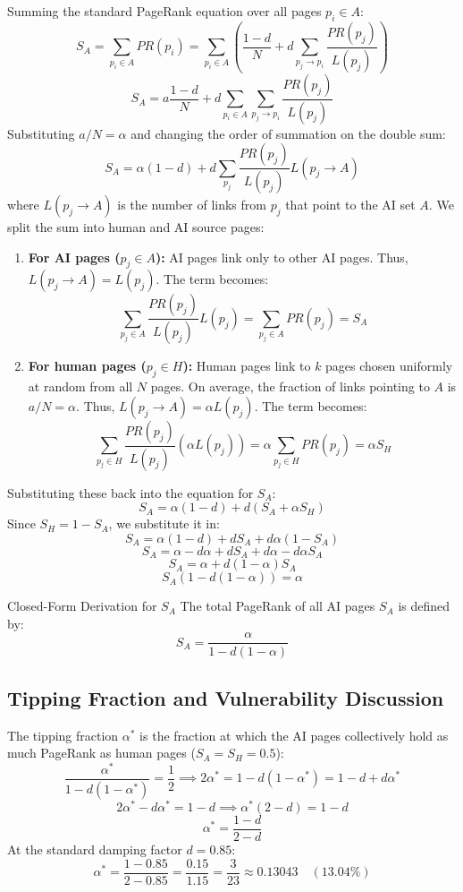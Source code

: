 \documentclass[11pt,a4paper]{article}
\begin{document}
Summing the standard PageRank equation over all pages $p_i \in A$:
\[ S_A = \sum_{p_i \in A} PR(p_i) = \sum_{p_i \in A} \left( \frac{1-d}{N} + d \sum_{p_j \to p_i} \frac{PR(p_j)}{L(p_j)} \right) \]
\[ S_A = a \frac{1-d}{N} + d \sum_{p_i \in A} \sum_{p_j \to p_i} \frac{PR(p_j)}{L(p_j)} \]
Substituting $a/N = \alpha$ and changing the order of summation on the double sum:
\[ S_A = \alpha(1-d) + d \sum_{p_j} \frac{PR(p_j)}{L(p_j)} L(p_j \to A) \]
where $L(p_j \to A)$ is the number of links from $p_j$ that point to the AI set $A$. We split the sum into human and AI source pages:
\begin{enumerate}
    \item \textbf{For AI pages ($p_j \in A$):} AI pages link only to other AI pages. Thus, $L(p_j \to A) = L(p_j)$. The term becomes:
    \[ \sum_{p_j \in A} \frac{PR(p_j)}{L(p_j)} L(p_j) = \sum_{p_j \in A} PR(p_j) = S_A \]
    \item \textbf{For human pages ($p_j \in H$):} Human pages link to $k$ pages chosen uniformly at random from all $N$ pages. On average, the fraction of links pointing to $A$ is $a/N = \alpha$. Thus, $L(p_j \to A) = \alpha L(p_j)$. The term becomes:
    \[ \sum_{p_j \in H} \frac{PR(p_j)}{L(p_j)} (\alpha L(p_j)) = \alpha \sum_{p_j \in H} PR(p_j) = \alpha S_H \]
\end{enumerate}
Substituting these back into the equation for $S_A$:
\[ S_A = \alpha(1-d) + d(S_A + \alpha S_H) \]
Since $S_H = 1 - S_A$, we substitute it in:
\[ S_A = \alpha(1-d) + d S_A + d\alpha(1 - S_A) \]
\[ S_A = \alpha - d\alpha + d S_A + d\alpha - d\alpha S_A \]
\[ S_A = \alpha + d(1 - \alpha) S_A \]
\[ S_A (1 - d(1 - \alpha)) = \alpha \]

\begin{resultbox}{Closed-Form Derivation for $S_A$}
The total PageRank of all AI pages $S_A$ is defined by:
\[ S_A = \frac{\alpha}{1 - d(1 - \alpha)} \]
\end{resultbox}

\subsection{Tipping Fraction and Vulnerability Discussion}
The tipping fraction $\alpha^*$ is the fraction at which the AI pages collectively hold as much PageRank as human pages ($S_A = S_H = 0.5$):
\[ \frac{\alpha^*}{1 - d(1 - \alpha^*)} = \frac{1}{2} \implies 2\alpha^* = 1 - d(1 - \alpha^*) = 1 - d + d\alpha^* \]
\[ 2\alpha^* - d\alpha^* = 1 - d \implies \alpha^*(2 - d) = 1 - d \]
\[ \alpha^* = \frac{1 - d}{2 - d} \]
At the standard damping factor $d = 0.85$:
\[ \alpha^* = \frac{1 - 0.85}{2 - 0.85} = \frac{0.15}{1.15} = \frac{3}{23} \approx 0.13043 \quad (13.04\%) \]
\end{document}
